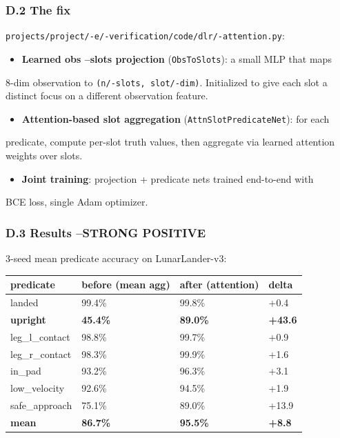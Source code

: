 \documentclass[11pt]{article}
\begin{document}
\subsubsection{D.2 The fix}

\texttt{projects/project/-e/-verification/code/dlr/-attention.py}:

\begin{itemize}
  \item \textbf{Learned obs --slots projection} (\texttt{ObsToSlots}): a small MLP that maps
\end{itemize}

  8-dim observation to \texttt{(n/-slots, slot/-dim)}. Initialized to give each
  slot a distinct focus on a different observation feature.
\begin{itemize}
  \item \textbf{Attention-based slot aggregation} (\texttt{AttnSlotPredicateNet}): for each
\end{itemize}

  predicate, compute per-slot truth values, then aggregate via learned
  attention weights over slots.
\begin{itemize}
  \item \textbf{Joint training}: projection + predicate nets trained end-to-end with
\end{itemize}

  BCE loss, single Adam optimizer.

\subsubsection{D.3 Results --STRONG POSITIVE}

3-seed mean predicate accuracy on LunarLander-v3:

\begin{tabular}{llll}
predicate & before (mean agg) & after (attention) & delta \\
\hline
landed & 99.4\% & 99.8\% & +0.4 \\
\textbf{upright} & \textbf{45.4\%} & \textbf{89.0\%} & \textbf{+43.6} \\
leg\_l\_contact & 98.8\% & 99.7\% & +0.9 \\
leg\_r\_contact & 98.3\% & 99.9\% & +1.6 \\
in\_pad & 93.2\% & 96.3\% & +3.1 \\
low\_velocity & 92.6\% & 94.5\% & +1.9 \\
safe\_approach & 75.1\% & 89.0\% & +13.9 \\
\textbf{mean} & \textbf{86.7\%} & \textbf{95.5\%} & \textbf{+8.8} \\
\end{tabular}
\end{document}
